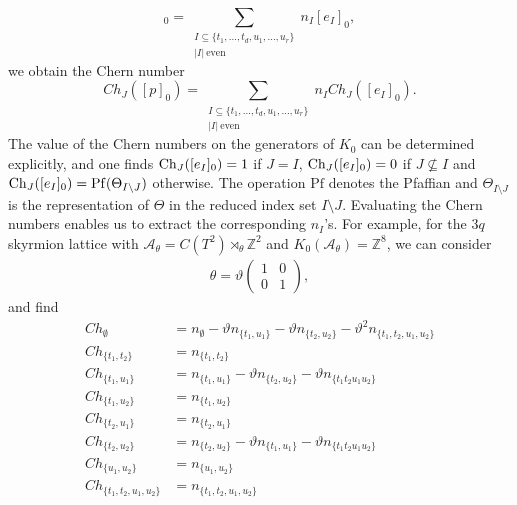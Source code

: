 \documentclass[submission, Phys]{SciPost}
\begin{document}
\begin{equation}
    [p]_0 = \sum_{\substack{I\subseteq\{t_1, \ldots, t_d, u_1, \ldots, u_r\}\\ |I|\ \text{even}}} n_I [e_I]_0,
\end{equation}
we obtain the Chern number
\begin{equation}
    Ch_J([p]_0) = \sum_{\substack{I\subseteq\{t_1, \ldots, t_d, u_1, \ldots, u_r\}\\ |I|\ \text{even}}} n_I Ch_J([e_I]_0).
\end{equation}
The value of the Chern numbers on the generators of $K_0$ can be determined explicitly, and one finds \cite{Prodan2016, Liu2022}
 ${\rm Ch}_{J}([e_I]_0)=1$ if $J=I$,  ${\rm Ch}_{J}([e_I]_0)=0$ if $J \not\subseteq I$ and ${\rm Ch}_{J}([e_I]_0) = \mathrm{Pf}( \Theta_{I\setminus J})$ otherwise.
The operation $\mathrm{Pf}$ denotes the Pfaffian and $\Theta_{I\setminus J}$ is the representation of $\Theta$ in the reduced index set $I\setminus J$.
Evaluating the Chern numbers enables us to extract the corresponding $n_I$'s.
For example, for the $3q$ skyrmion lattice with $\mathcal{A}_\theta=C(T^2)\rtimes_\theta \mathbb{Z}^2$ and $K_0(\mathcal{A}_\theta)=\mathbb{Z}^8$, we can consider
\begin{align}
    \theta = \vartheta \begin{pmatrix}
        1 & 0 \\
        0 & 1
    \end{pmatrix},
\end{align}
and find
\begin{align}
    Ch_{\emptyset} &= n_{\emptyset} - \vartheta n_{\lbrace t_1, u_1\rbrace} - \vartheta n_{\lbrace t_2, u_2 \rbrace} - \vartheta^2 n_{\lbrace t_1, t_2, u_1, u_2 \rbrace} \label{eq:Chernnumbers1}
\\
Ch_{\lbrace t_1,t_2 \rbrace} &= n_{\lbrace t_1,t_2\rbrace} \label{eq:Chernnumbers2}
\\
Ch_{\lbrace t_1, u_1 \rbrace} &= n_{\lbrace t_1 ,u_1\rbrace} - \vartheta n_{\lbrace t_2, u_2 \rbrace} - \vartheta n_{\lbrace t_1 t_2 u_1 u_2 \rbrace} \label{eq:Chernnumbers3}
\\
Ch_{\lbrace t_1, u_2 \rbrace}&= n_{\lbrace t_1,u_2\rbrace} \label{eq:Chernnumbers4}
\\
Ch_{\lbrace t_2, u_1 \rbrace} &= n_{\lbrace t_2,u_1\rbrace} \label{eq:Chernnumbers5}
\\
Ch_{\lbrace t_2 ,u_2 \rbrace} &=
  n_{\lbrace t_2 ,u_2\rbrace} -\vartheta n_{\lbrace t_1, u_1 \rbrace} - \vartheta n_{\lbrace t_1 t_2 u_1 u_2 \rbrace} \label{eq:Chernnumbers6}
\\
Ch_{\lbrace u_1 , u_2 \rbrace} &= n_{\lbrace u_1 , u_2 \rbrace} \label{eq:Chernnumbers7}
\\
Ch_{\lbrace t_1, t_2, u_1, u_2  \rbrace} &= n_{\lbrace t_1, t_2, u_1, u_2 \rbrace}
\label{eq:Chernnumbers8}
\end{align}
\end{document}
